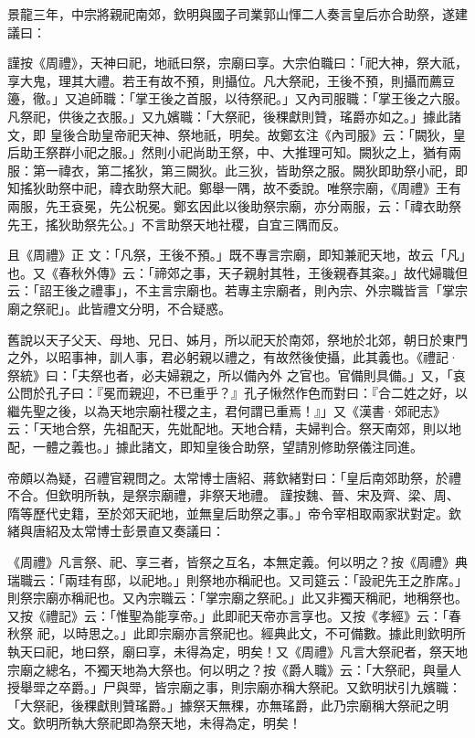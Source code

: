 \begin{pinyinscope}
 景龍三年，中宗將親祀南郊，欽明與國子司業郭山惲二人奏言皇后亦合助祭，遂建議曰：



 謹按《周禮》，天神曰祀，地祇曰祭，宗廟曰享。大宗伯職曰：「祀大神，祭大祇，享大鬼，理其大禮。若王有故不預，則攝位。凡大祭祀，王後不預，則攝而薦豆籩，徹。」又追師職：「掌王後之首服，以待祭祀。」又內司服職：「掌王後之六服。凡祭祀，供後之衣服。」又九嬪職：「大祭祀，後稞獻則贊，瑤爵亦如之。」據此諸文，即
 皇後合助皇帝祀天神、祭地祇，明矣。故鄭玄注《內司服》云：「闕狄，皇后助王祭群小祀之服。」然則小祀尚助王祭，中、大推理可知。闕狄之上，猶有兩服：第一禕衣，第二搖狄，第三闕狄。此三狄，皆助祭之服。闕狄即助祭小祀，即知搖狄助祭中祀，禕衣助祭大祀。鄭舉一隅，故不委說。唯祭宗廟，《周禮》王有兩服，先王袞冕，先公柷冕。鄭玄因此以後助祭宗廟，亦分兩服，云：「禕衣助祭先王，搖狄助祭先公。」不言助祭天地社稷，自宜三隅而反。



 且《周禮》正
 文：「凡祭，王後不預。」既不專言宗廟，即知兼祀天地，故云「凡」也。又《春秋外傳》云：「禘郊之事，天子親射其牲，王後親舂其粢。」故代婦職但云：「詔王後之禮事」，不主言宗廟也。若專主宗廟者，則內宗、外宗職皆言「掌宗廟之祭祀」。此皆禮文分明，不合疑惑。



 舊說以天子父天、母地、兄日、姊月，所以祀天於南郊，祭地於北郊，朝日於東門之外，以昭事神，訓人事，君必躬親以禮之，有故然後使攝，此其義也。《禮記·祭統》曰：「夫祭也者，必夫婦親之，所以備內外
 之官也。官備則具備。」又，「哀公問於孔子曰：『冕而親迎，不已重乎？』孔子愀然作色而對曰：『合二姓之好，以繼先聖之後，以為天地宗廟社稷之主，君何謂已重焉！』」又《漢書·郊祀志》云：「天地合祭，先祖配天，先妣配地。天地合精，夫婦判合。祭天南郊，則以地配，一體之義也。」據此諸文，即知皇後合助祭，望請別修助祭儀注同進。



 帝頗以為疑，召禮官親問之。太常博士唐紹、蔣欽緒對曰：「皇后南郊助祭，於禮不合。但欽明所執，是祭宗廟禮，非祭天地禮。
 謹按魏、晉、宋及齊、梁、周、隋等歷代史籍，至於郊天祀地，並無皇后助祭之事。」帝令宰相取兩家狀對定。欽緒與唐紹及太常博士彭景直又奏議曰：



 《周禮》凡言祭、祀、享三者，皆祭之互名，本無定義。何以明之？按《周禮》典瑞職云：「兩珪有邸，以祀地。」則祭地亦稱祀也。又司筵云：「設祀先王之胙席。」則祭宗廟亦稱祀也。又內宗職云：「掌宗廟之祭祀。」此又非獨天稱祀，地稱祭也。又按《禮記》云：「惟聖為能享帝。」此即祀天帝亦言享也。又按《孝經》云：「春秋祭
 祀，以時思之。」此即宗廟亦言祭祀也。經典此文，不可備數。據此則欽明所執天曰祀，地曰祭，廟曰享，未得為定，明矣！又《周禮》凡言大祭祀者，祭天地宗廟之總名，不獨天地為大祭也。何以明之？按《爵人職》云：「大祭祀，與量人授舉斝之卒爵。」尸與斝，皆宗廟之事，則宗廟亦稱大祭祀。又欽明狀引九嬪職：「大祭祀，後稞獻則贊瑤爵。」據祭天無稞，亦無瑤爵，此乃宗廟稱大祭祀之明文。欽明所執大祭祀即為祭天地，未得為定，明矣！




\end{pinyinscope}
